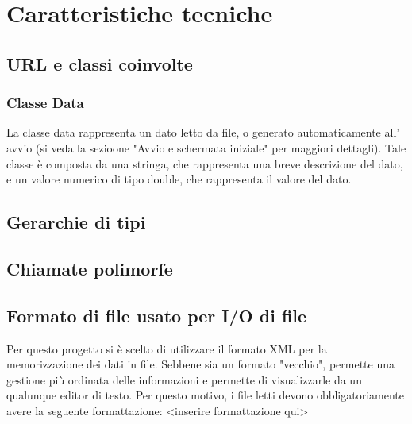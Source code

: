 \documentclass[10pt]{article}
\begin{document}
    \section{Caratteristiche tecniche}
    \subsection{URL e classi coinvolte}
    \subsubsection{Classe Data}
    La classe data rappresenta un dato letto da file, o generato automaticamente all' avvio (si veda la sezioone "Avvio e schermata iniziale" per maggiori dettagli).
    Tale classe è composta da una stringa, che rappresenta una breve descrizione del dato, e un valore numerico di tipo double, che rappresenta il valore del dato.
    \subsection{Gerarchie di tipi}
    \subsection{Chiamate polimorfe}
    \subsection{Formato di file usato per I/O di file}
    Per questo progetto si è scelto di utilizzare il formato XML per la memorizzazione dei dati in file. Sebbene sia un formato "vecchio", permette una gestione più ordinata delle informazioni e permette di visualizzarle da un qualunque editor di testo.
    Per questo motivo, i file letti devono obbligatoriamente avere la seguente formattazione: <inserire formattazione qui>
	
\end{document}

